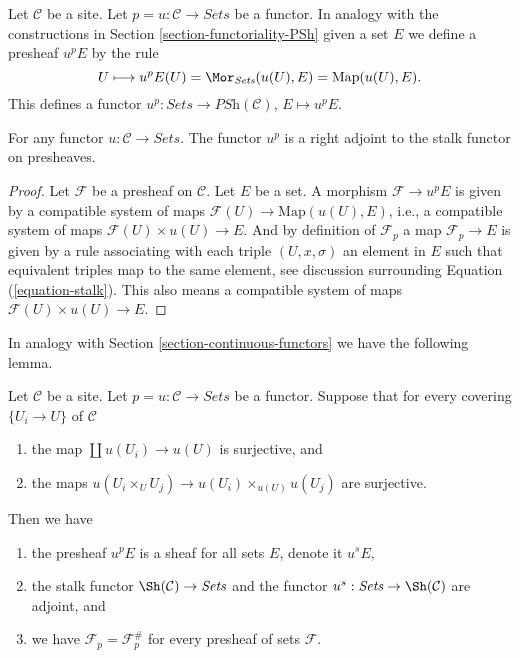 \noindent
Let $\mathcal{C}$ be a site. Let $p = u : \mathcal{C} \to \textit{Sets}$
be a functor. In analogy with the constructions in
Section \ref{section-functoriality-PSh}
given a set $E$ we define a presheaf $u^pE$ by the rule
\begin{equation}
\label{equation-skyscraper}
U
\longmapsto
u^pE(U) = \Mor_{\textit{Sets}}(u(U), E) = \text{Map}(u(U), E).
\end{equation}
This defines a functor
$u^p : \textit{Sets} \to \textit{PSh}(\mathcal{C})$, $E \mapsto u^pE$.

\begin{lemma}
\label{lemma-adjoint-point-push-stalk}
For any functor $u : \mathcal{C} \to \textit{Sets}$.
The functor $u^p$ is a right adjoint to the stalk functor
on presheaves.
\end{lemma}

\begin{proof}
Let $\mathcal{F}$ be a presheaf on $\mathcal{C}$.
Let $E$ be a set. A morphism $\mathcal{F} \to u^pE$
is given by a compatible system of maps
$\mathcal{F}(U) \to \text{Map}(u(U), E)$, i.e.,
a compatible system of maps $\mathcal{F}(U) \times u(U) \to E$.
And by definition of $\mathcal{F}_p$ a map $\mathcal{F}_p \to E$
is given by a rule associating with each triple $(U, x, \sigma)$
an element in $E$ such that equivalent triples map to the same element, see
discussion surrounding
Equation (\ref{equation-stalk}).
This also means a compatible system of maps $\mathcal{F}(U) \times u(U) \to E$.
\end{proof}

\noindent
In analogy with Section \ref{section-continuous-functors}
we have the following lemma.

\begin{lemma}
\label{lemma-point-pushforward-sheaf}
Let $\mathcal{C}$ be a site. Let $p = u : \mathcal{C} \to \textit{Sets}$
be a functor. Suppose that for every covering $\{U_i \to U\}$ of $\mathcal{C}$
\begin{enumerate}
\item the map $\coprod u(U_i) \to u(U)$ is surjective, and
\item the maps
$u(U_i \times_U U_j) \to u(U_i) \times_{u(U)} u(U_j)$ are surjective.
\end{enumerate}
Then we have
\begin{enumerate}
\item the presheaf $u^pE$ is a sheaf for all sets $E$, denote it $u^sE$,
\item the stalk functor $\Sh(\mathcal{C}) \to \textit{Sets}$
and the functor $u^s: \textit{Sets} \to \Sh(\mathcal{C})$ are
adjoint, and
\item we have $\mathcal{F}_p = \mathcal{F}^\#_p$
for every presheaf of sets $\mathcal{F}$.
\end{enumerate}
\end{lemma}

